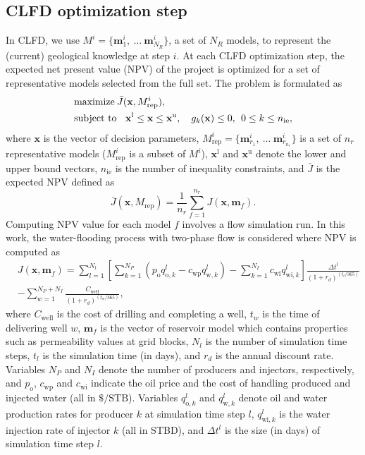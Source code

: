 \documentclass[11pt]{article}
\begin{document}
\subsection{CLFD optimization step} \label{opt}
In CLFD, we use $M^i= \{\mathbf{m}_{1}^i,  \ \ldots \ \mathbf{m}_{N_R}^i\}$,
a set of $N_R$ models, to represent the (current) geological knowledge at step $i$.
At each CLFD optimization step, the expected net present value (NPV)
of the project is optimized for a set of representative models selected from the full set.
The problem is formulated as
%
\begin{equation}\label{eq:opt}
\begin{split}
& \text{maximize} \: \bar{J}(\mathbf{x},M^i_{\text{rep}}), \\
&  {\rm subject~to} \ \  \: \mathbf{x}^{\text{l}}\leq\mathbf{x}\leq \mathbf{x}^{\text{u}}, \quad  g_k(\mathbf{x}) \le 0,\:\: 0\le k \le n_{\text{ie}},
\end{split}
\end{equation}
%
where $\mathbf{x}$ is the vector of decision parameters,
$M^i_{\text{rep}}= \{\mathbf{m}_{r_1}^i,  \ \ldots \ \mathbf{m}_{r_{n_r}}^i\}$ is a set of $n_r$ representative models ($M^i_{\text{rep}}$ is a subset of $M^i$),
$\mathbf{x}^{\text{l}}$ and $\mathbf{x}^{\text{u}}$ denote the lower and upper bound vectors,
$n_{\text{ie}}$ is the number of inequality constraints,
and $\bar{J}$ is the expected NPV defined as
%
\begin{equation}\label{eq:npv}
\bar{J}(\mathbf{x},M_{\text{rep}}) = \frac{1}{n_r}\sum_{f=1}^{n_r}J(\mathbf{x},\mathbf{m}_f).
\end{equation}
Computing NPV value for each model $f$ involves a flow simulation run.
In this work, the water-flooding process with two-phase flow is considered where NPV
is computed as
%
\begin{equation}\label{eq:npv}
\begin{split}
& J(\mathbf{x},\mathbf{m}_f) = \sum_{l=1}^{N_l} \left[\sum_{k=1}^{N_P}(p_{\text{o}}q_{\text{o},k}^l-c_{\text{wp}}q_{\text{w},k}^l)-\sum_{k=1}^{N_I}c_{\text{wi}}q_{\text{wi},k}^l \right] \frac{\Delta t^l}{(1+r_d)^{(t_l/365)}}\\
& -\sum_{w=1}^{N_P+N_I}\frac{C_{\text{well}}}{(1+r_d)^{(t_w/365)}},
\end{split}
\end{equation}
%
where $C_{\text{well}}$ is the cost of drilling and completing a well,
$t_w$ is the time of delivering well $w$,
$\mathbf{m}_f$ is the vector of reservoir model which contains properties such as permeability values at grid blocks,
$N_l$ is the number of simulation time steps,
$t_l$ is the simulation time (in days),
and $r_d$ is the annual discount rate.
Variables $N_P$ and $N_I$ denote the number
of producers and injectors, respectively, and
$p_{\text{o}}$, $c_{\text{wp}}$ and $c_{\text{wi}}$
indicate the oil price and the cost of
handling produced and injected water (all in $\$/\text{STB}$).
Variables $q_{\text{o},k}^l$ and $q_{\text{w},k}^l$ denote
oil and water production rates for producer $k$
at simulation time step $l$,
$q_{\text{wi},k}^l$ is
the water injection rate of injector $k$ (all in STBD),
and $\Delta{t^l}$ is the size (in days) of simulation time step $l$.
\end{document}

